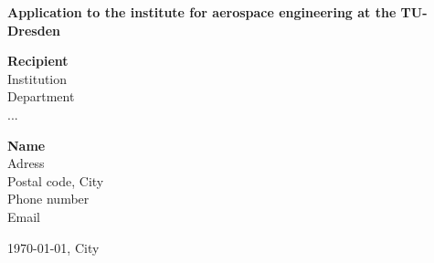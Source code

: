 \documentclass[12pt]{article}
\begin{document}
    \pagestyle{fancy}
    \fancyhead{}
    \fancyfoot{} %
    \fancyfoot[C]{\thepage}

    {\selectfont
        \begin{center}
            {\Large \textbf{Application to the institute for aerospace engineering at the TU-Dresden}}
        \end{center}

        \vspace{1cm}

        {\large
            \begin{varwidth}[t]{0.5\textwidth}
                \textbf{Recipient}\\
                Institution\\
                Department\\
                ...
            \end{varwidth}\hfill
            \begin{varwidth}[t]{0.5\textwidth}
                \textbf{Name}\\
                Adress\\
                Postal code, City\\
                Phone number\\
                Email
            \end{varwidth}
        }

        \vspace{1cm}

        \begin{flushright}
            \today, City
        \end{flushright}

        

        
    }
\end{document}
